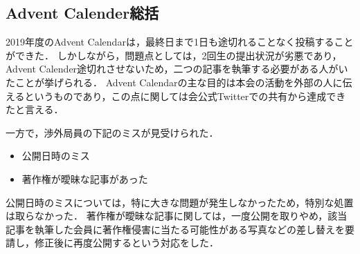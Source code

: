 \subsection*{Advent Calender総括}


2019年度のAdvent Calendarは，最終日まで1日も途切れることなく投稿することができた．
しかしながら，問題点としては，2回生の提出状況が劣悪であり，Advent Calender途切れさせないため，二つの記事を執筆する必要がある人がいたことが挙げられる．
Advent Calendarの主な目的は本会の活動を外部の人に伝えるというものであり，この点に関しては会公式Twitterでの共有から達成できたと言える．

一方で，渉外局員の下記のミスが見受けられた．
\begin{itemize}
\item 公開日時のミス
\item 著作権が曖昧な記事があった
\end{itemize}
公開日時のミスについては，特に大きな問題が発生しなかったため，特別な処置は取らなかった．
著作権が曖昧な記事に関しては，一度公開を取りやめ，該当記事を執筆した会員に著作権侵害に当たる可能性がある写真などの差し替えを要請し，修正後に再度公開するという対応をした．

